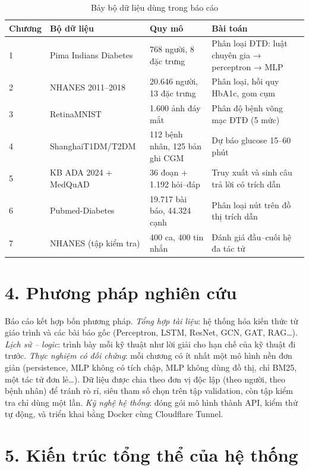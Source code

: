 \begin{table}[H]
\centering
\caption{Bảy bộ dữ liệu dùng trong báo cáo}
\label{tab:datasets}
\small
\begin{tabularx}{\linewidth}{@{}L{1.4cm}L{3.6cm}L{3.4cm}Y@{}}
\toprule
\textbf{Chương} & \textbf{Bộ dữ liệu} & \textbf{Quy mô} & \textbf{Bài toán} \\
 & Pima Indians Diabetes \cite{smith1988} & 768 người, 8 đặc trưng & Phân loại ĐTĐ: luật chuyên gia → perceptron → MLP \\
2 & NHANES 2011–2018 \cite{nhanes} & 20.646 người, 13 đặc trưng & Phân loại, hồi quy HbA1c, gom cụm \\
3 & RetinaMNIST \cite{yang2023medmnist} & 1.600 ảnh đáy mắt & Phân độ bệnh võng mạc ĐTĐ (5 mức) \\
4 & ShanghaiT1DM/T2DM \cite{zhao2023shanghai} & 112 bệnh nhân, 125 bản ghi CGM & Dự báo glucose 15–60 phút \\
5 & KB ADA 2024 + MedQuAD \cite{benabacha2019} & 36 đoạn + 1.192 hỏi–đáp & Truy xuất và sinh câu trả lời có trích dẫn \\
6 & Pubmed-Diabetes \cite{namata2012} & 19.717 bài báo, 44.324 cạnh & Phân loại nút trên đồ thị trích dẫn \\
7 & NHANES (tập kiểm tra) & 400 ca, 400 tin nhắn & Đánh giá đầu–cuối hệ đa tác tử \\
\bottomrule
\end{tabularx}
\end{table}

\section*{4. Phương pháp nghiên cứu}

Báo cáo kết hợp bốn phương pháp. \emph{Tổng hợp tài liệu}: hệ thống hóa kiến thức từ giáo trình và các bài báo gốc (Perceptron, LSTM, ResNet, GCN, GAT, RAG\ldots). \emph{Lịch sử – logic}: trình bày mỗi kỹ thuật như lời giải cho hạn chế của kỹ thuật đi trước. \emph{Thực nghiệm có đối chứng}: mỗi chương có ít nhất một mô hình nền đơn giản (persistence, MLP không có tích chập, MLP không dùng đồ thị, chỉ BM25, một tác tử đơn lẻ\ldots). Dữ liệu được chia theo đơn vị độc lập (theo người, theo bệnh nhân) để tránh rò rỉ, siêu tham số chọn trên tập validation, còn tập kiểm tra chỉ dùng một lần. \emph{Kỹ nghệ hệ thống}: đóng gói mô hình thành API, kiểm thử tự động, và triển khai bằng Docker cùng Cloudflare Tunnel.

\section*{5. Kiến trúc tổng thể của hệ thống}

